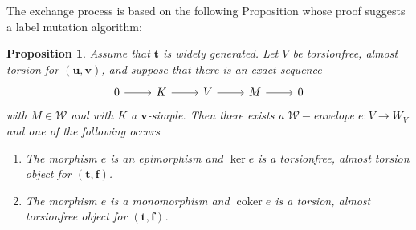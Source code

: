 \documentclass[10pt,a4paper]{amsart}
\newtheorem{proposition}[theorem]{Proposition}
\newcommand{\coker}{\operatorname{coker}}
\newcommand{\tpair}[2]{(\mathbf{#1}, \mathbf{#2})  }
\begin{document}
The exchange process is based on the following Proposition whose proof suggests a label mutation algorithm:

\begin{proposition}
\label{prop:exchange-algo}
Assume that \(\mathbf t\) is widely generated. Let \(V\)  be torsionfree, almost torsion for \(\tpair{u}{v}\), and suppose that there is an exact sequence
\[
\begin{tikzcd}
0\ar[r] & K \ar[r] & V\ar[r] & M \ar[r] & 0
\end{tikzcd}
\]
with \(M\in\mathcal{W}\) and with \(K\) a \(\mathbf v\)-simple. Then there exists a \( \mathcal{W}-\)envelope \( e : V \to W_V \) and one of the following occurs
\begin{enumerate}
\item The morphism \(e \) is an epimorphism and \(\ker e \) is a torsionfree, almost torsion object for \( \tpair{t}{f} \).
\item The morphism \(e \) is a monomorphism and \( \coker e \) is a torsion, almost torsionfree object for \( \tpair{t}{f} \).
\end{enumerate}
\end{proposition}
\end{document}
